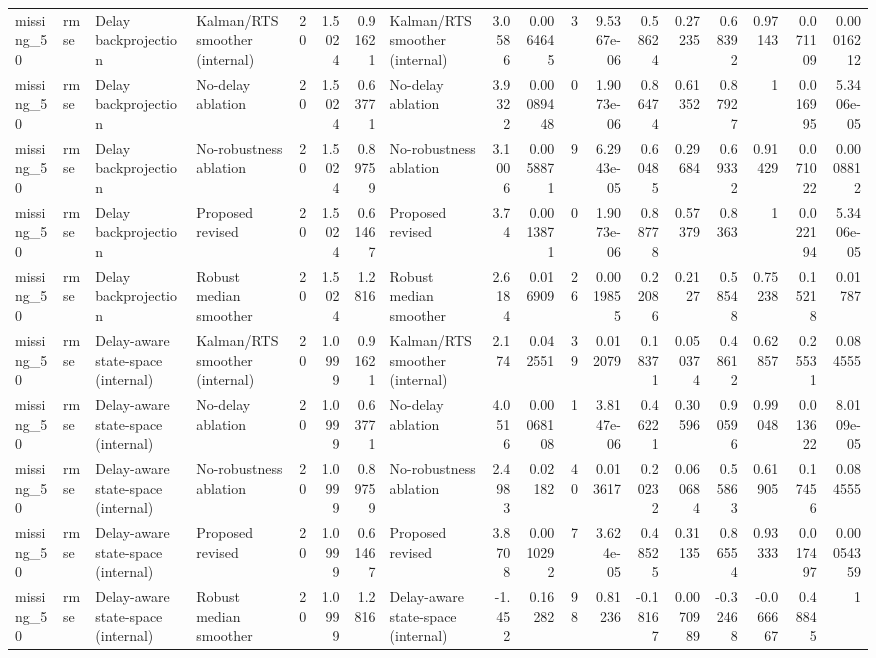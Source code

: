 \begin{table}[!htbp]
{\begin{tabular}{llllrrrlrrrrrrrrrr}
missing_50 & rmse & Delay backprojection & Kalman/RTS smoother (internal) & 20 & 1.5024 & 0.91621 & Kalman/RTS smoother (internal) & 3.0586 & 0.0064645 & 3 & 9.5367e-06 & 0.58624 & 0.27235 & 0.68392 & 0.97143 & 0.071109 & 0.00016212 \\
missing_50 & rmse & Delay backprojection & No-delay ablation & 20 & 1.5024 & 0.63771 & No-delay ablation & 3.9322 & 0.00089448 & 0 & 1.9073e-06 & 0.86474 & 0.61352 & 0.87927 & 1 & 0.016995 & 5.3406e-05 \\
missing_50 & rmse & Delay backprojection & No-robustness ablation & 20 & 1.5024 & 0.89759 & No-robustness ablation & 3.1006 & 0.0058871 & 9 & 6.2943e-05 & 0.60485 & 0.29684 & 0.69332 & 0.91429 & 0.071022 & 0.0008812 \\
missing_50 & rmse & Delay backprojection & Proposed revised & 20 & 1.5024 & 0.61467 & Proposed revised & 3.74 & 0.0013871 & 0 & 1.9073e-06 & 0.88778 & 0.57379 & 0.8363 & 1 & 0.022194 & 5.3406e-05 \\
missing_50 & rmse & Delay backprojection & Robust median smoother & 20 & 1.5024 & 1.2816 & Robust median smoother & 2.6184 & 0.016909 & 26 & 0.0019855 & 0.22086 & 0.2127 & 0.58548 & 0.75238 & 0.15218 & 0.01787 \\
missing_50 & rmse & Delay-aware state-space (internal) & Kalman/RTS smoother (internal) & 20 & 1.0999 & 0.91621 & Kalman/RTS smoother (internal) & 2.174 & 0.042551 & 39 & 0.012079 & 0.18371 & 0.050374 & 0.48612 & 0.62857 & 0.25531 & 0.084555 \\
missing_50 & rmse & Delay-aware state-space (internal) & No-delay ablation & 20 & 1.0999 & 0.63771 & No-delay ablation & 4.0516 & 0.00068108 & 1 & 3.8147e-06 & 0.46221 & 0.30596 & 0.90596 & 0.99048 & 0.013622 & 8.0109e-05 \\
missing_50 & rmse & Delay-aware state-space (internal) & No-robustness ablation & 20 & 1.0999 & 0.89759 & No-robustness ablation & 2.4983 & 0.02182 & 40 & 0.013617 & 0.20232 & 0.060684 & 0.55863 & 0.61905 & 0.17456 & 0.084555 \\
missing_50 & rmse & Delay-aware state-space (internal) & Proposed revised & 20 & 1.0999 & 0.61467 & Proposed revised & 3.8708 & 0.0010292 & 7 & 3.624e-05 & 0.48525 & 0.31135 & 0.86554 & 0.93333 & 0.017497 & 0.00054359 \\
missing_50 & rmse & Delay-aware state-space (internal) & Robust median smoother & 20 & 1.0999 & 1.2816 & Delay-aware state-space (internal) & -1.452 & 0.16282 & 98 & 0.81236 & -0.18167 & 0.0070989 & -0.32468 & -0.066667 & 0.48845 & 1 \\

\end{tabular}}
\end{table}
